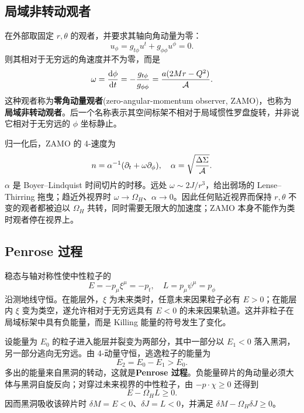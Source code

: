 \subsection{局域非转动观者}

在外部取固定 $r,\theta$ 的观者，并要求其轴向角动量为零：
\[
    u_\phi=g_{t\phi}u^t+g_{\phi\phi}u^\phi=0.
\]
则其相对于无穷远的角速度并不为零，而是
\begin{equation}
    \omega=\frac{\dd\phi}{\dd t}
      =-\frac{g_{t\phi}}{g_{\phi\phi}}
      =\frac{a(2Mr-Q^2)}{\mathcal A}.
\end{equation}
这种观者称为\textbf{零角动量观者}(zero-angular-momentum observer, ZAMO)，也称为\textbf{局域非转动观者}。后一个名称表示其空间标架不相对于局域惯性罗盘旋转，并非说它相对于无穷远的 $\phi$ 坐标静止。

归一化后，ZAMO 的 4-速度为
\begin{equation}
    n=\alpha^{-1}(\partial_t+\omega\partial_\phi),
    \quad
    \alpha=\sqrt{\frac{\Delta\Sigma}{\mathcal A}}.
\end{equation}
$\alpha$ 是 Boyer--Lindquist 时间切片的时移。远处 $\omega\sim2J/r^3$，给出弱场的 Lense--Thirring 拖曳；趋近外视界时 $\omega\to\Omega_H$、$\alpha\to0$。因此任何贴近视界而保持 $r,\theta$ 不变的观者都被迫以 $\Omega_H$ 共转，同时需要无限大的加速度；ZAMO 本身不能作为类时观者停在视界上。

\subsection{Penrose 过程}

稳态与轴对称性使中性粒子的
\[
    E=-p_\mu\xi^\mu=-p_t,
    \quad L=p_\mu\psi^\mu=p_\phi
\]
沿测地线守恒。在能层外，$\xi$ 为未来类时，任意未来因果粒子必有 $E>0$；在能层内 $\xi$ 变为类空，遂允许相对于无穷远具有 $E<0$ 的未来因果轨道。这并非粒子在局域标架中具有负能量，而是 Killing 能量的符号发生了变化。

设能量为 $E_0$ 的粒子进入能层并裂变为两部分，其中一部分以 $E_1<0$ 落入黑洞，另一部分逃向无穷远。由 4-动量守恒，逃逸粒子的能量为
\[
    E_2=E_0-E_1>E_0.
\]
多出的能量来自黑洞的转动，这就是\textbf{Penrose 过程}。负能量碎片的角动量必须大体与黑洞自旋反向；对穿过未来视界的中性粒子，由 $-p\cdot\chi\geqslant0$ 还得到
\begin{equation}
    E-\Omega_H L\geqslant0.
\end{equation}
因而黑洞吸收该碎片时 $\delta M=E<0$、$\delta J=L<0$，并满足 $\delta M-\Omega_H\delta J\geqslant0$。

